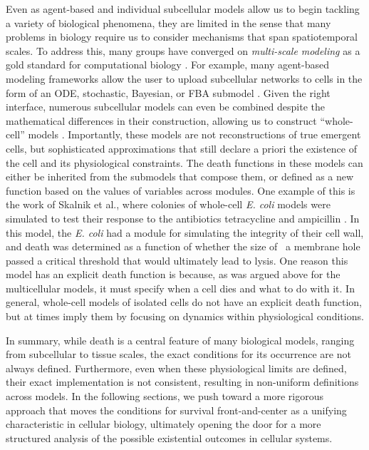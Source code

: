 \documentclass{article}
\begin{document}
Even as agent-based and individual subcellular models allow us to begin tackling a variety of biological phenomena, they are limited in the sense that many problems in biology require us to consider mechanisms that span spatiotemporal scales. To address this, many groups have converged on \textit{multi-scale modeling }as a gold standard for computational biology \cite{walpole_multiscale_2013}. For example, many agent-based modeling frameworks allow the user to upload subcellular networks to cells in the form of an ODE, stochastic, Bayesian, or FBA submodel \cite{swat_multi-scale_2012,starrus_morpheus_2014,ghaffarizadeh_physicell_2018,ruscone_building_2024}. Given the right interface, numerous subcellular models can even be combined despite the mathematical differences in their construction, allowing us to construct “whole-cell” models \cite{karr_whole-cell_2012, agmon_multi-scale_2020,johnson_building_2023}. Importantly, these models are not reconstructions of true emergent cells, but sophisticated approximations that still declare a priori the existence of the cell and its physiological constraints. The death functions in these models can either be inherited from the submodels that compose them, or defined as a new function based on the values of variables across modules. One example of this is the work of Skalnik et al., where colonies of whole-cell \textit{E. coli }models were simulated to test their response to the antibiotics tetracycline and ampicillin \cite{skalnik_whole-colony_2021}. In this model, the \textit{E. coli }had a module for simulating the integrity of their cell wall, and death was determined as a function of whether the size of  a membrane hole passed a critical threshold that would ultimately lead to lysis. One reason this model has an explicit death function is because, as was argued above for the multicellular models, it must specify when a cell dies and what to do with it. In general, whole-cell models of isolated cells do not have an explicit death function, but at times imply them by focusing on dynamics within physiological conditions.

In summary, while death is a central feature of many biological models, ranging from subcellular to tissue scales, the exact conditions for its occurrence are not always defined. Furthermore, even when these physiological limits are defined, their exact implementation is not consistent, resulting in non-uniform definitions across models. In the following sections, we push toward a more rigorous approach that moves the conditions for survival front-and-center as a unifying characteristic in cellular biology, ultimately opening the door for a more structured analysis of the possible existential outcomes in cellular systems. 
\end{document}
